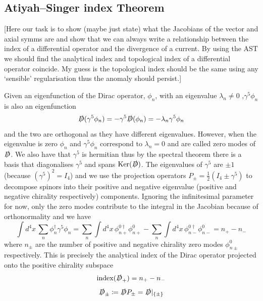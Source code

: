 \documentclass[11pt, a4paper]{article}
\theoremstyle{definition}
\theoremstyle{plain}
\begin{document}
\subsection{Atiyah–Singer index Theorem}

[Here our task is to show (maybe just state) what the Jacobians of the vector and axial 
symms are and show that we can always write a relationship between the
index of a differential operator and the divergence of a current. By using
the AST we should find the analytical index and topological index of
a differential operator coincide. My guess is the topological index should
be the same using any `sensible' regularisation thus the anomaly should
persist.]

Given an eigenfunction of the Dirac operator, $\phi_n$, with an eigenvalue $\lambda_n \neq 0$ 
,$\gamma^5\phi_n$ is also an eigenfunction
\begin{equation}
  \slashed{D}(\gamma^5\phi_n) = -\gamma^5\slashed{D}(\phi_n) = -\lambda_n\gamma^5\phi_n
\end{equation}
and the two are orthogonal as they have different eigenvalues.
However, when the eigenvalue is zero $\phi_n$ and $\gamma^5\phi_n$ correspond to $\lambda_n = 0$
and are called zero modes of $\slashed{D}$. We also have that $\gamma^5$ is 
hermitian thus by the spectral theorem there is a basis that diagonalises $\gamma^5$
and spans $\mathrm{Ker}(\slashed{D})$. The eigenvalues of $\gamma^5$ are $\pm 1$
(because ${(\gamma^5)}^2 = I_4$) and we use the projection
operators $P_\pm = \frac{1}{2}(I_4 \pm \gamma^5)$ to decompose
spinors into their positive and negative eigenvalue (positive and negative chirality respectively)
components. Ignoring the infinitesimal parameter for now, only the zero modes contribute
to the integral in the Jacobian because of orthonormality and we have
\begin{equation}
  \int{d^4x\, \sum_n{\phi^\dagger_n\gamma^5\phi_n}}
  = \sum_n{\int{d^4x\,\phi^{0\dagger}_{n+}\phi^0_{n+}}}
  -\sum_n{\int{d^4x\,\phi^{0\dagger}_{n-}\phi^0_{n-}}} = n_+ - n_-
\end{equation}
where $n_\pm$ are the number of positive and negative chirality zero modes $\phi^0_{n\pm}$
respectively. This is precisely the analytical index of the Dirac operator 
projected onto the positive chirality subspace
\begin{equation}
  \mathrm{index}(\slashed{D}_{+}) = n_+ - n_- 
\end{equation}
\begin{equation}
  \slashed{D}_\pm \coloneq \slashed{D}P_{\pm} = \slashed{D}|_{\{\pm\}} 
\end{equation}
\end{document}
